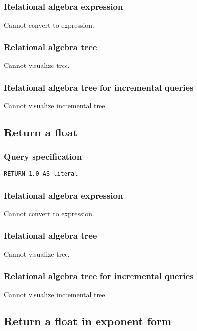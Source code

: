 \subsubsection*{Relational algebra expression}

Cannot convert to expression.

\subsubsection*{Relational algebra tree}

Cannot visualize tree.

\subsubsection*{Relational algebra tree for incremental queries}

Cannot visualize incremental tree.

\subsection{Return a float}

\subsubsection*{Query specification}

\begin{lstlisting}
RETURN 1.0 AS literal
\end{lstlisting}

\subsubsection*{Relational algebra expression}

Cannot convert to expression.

\subsubsection*{Relational algebra tree}

Cannot visualize tree.

\subsubsection*{Relational algebra tree for incremental queries}

Cannot visualize incremental tree.

\subsection{Return a float in exponent form}

